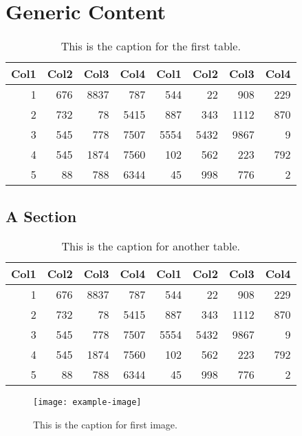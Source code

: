 \chapter{Generic Content}
    \lipsum[1]
    \begin{table}
        \centering
        \begin{tabular}{r r r r r r r r}
             Col1 & Col2 & Col3 & Col4 & Col1 & Col2 & Col3 & Col4 \\
             \hline
             1    & 676  & 8837 & 787  & 544  & 22   & 908  & 229  \\
             2    & 732  & 78   & 5415 & 887  & 343  & 1112 & 870  \\
             3    & 545  & 778  & 7507 & 5554 & 5432 & 9867 & 9    \\
             4    & 545  & 1874 & 7560 & 102  & 562  & 223  & 792  \\
             5    & 88   & 788  & 6344 & 45   & 998  & 776  & 2    \\
             \hline
        \end{tabular}
        \caption{This is the caption for the first table.}
    \end{table}
    \lipsum[2]

\section{A Section}
    \lipsum[3]
    \begin{table}
        \centering
        \begin{tabular}{r r r r r r r r}
             Col1 & Col2 & Col3 & Col4 & Col1 & Col2 & Col3 & Col4 \\
             \hline
             1    & 676  & 8837 & 787  & 544  & 22   & 908  & 229  \\
             2    & 732  & 78   & 5415 & 887  & 343  & 1112 & 870  \\
             3    & 545  & 778  & 7507 & 5554 & 5432 & 9867 & 9    \\
             4    & 545  & 1874 & 7560 & 102  & 562  & 223  & 792  \\
             5    & 88   & 788  & 6344 & 45   & 998  & 776  & 2    \\
             \hline
        \end{tabular}
        \caption{This is the caption for another table.}
    \end{table}
    \lipsum[4-5]
    \begin{figure}
        \centering
        \texttt{[image: example-image]}
        \caption{This is the caption for first image.}
    \end{figure}

